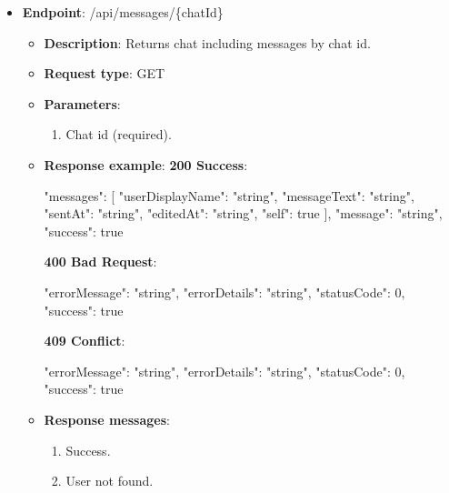 \begin{itemize}
    \item \textbf{Endpoint}: /api/messages/\{chatId\}
    \begin{itemize}
        \item \textbf{Description}: Returns chat including messages by chat id.
        \item \textbf{Request type}: GET
        \item \textbf{Parameters}:
        \begin{enumerate}
            \item Chat id (required).
        \end{enumerate}
        \item \textbf{Response example}:
        \textbf{200 Success}:
        \begin{spverbatim}
        {
            "messages": [
                {
                "userDisplayName": "string",
                "messageText": "string",
                "sentAt": "string",
                "editedAt": "string",
                "self": true
            }
            ],
            "message": "string",
            "success": true
        }
        \end{spverbatim}
        \textbf{400 Bad Request}:
        \begin{spverbatim}
        {
            "errorMessage": "string",
            "errorDetails": "string",
            "statusCode": 0,
            "success": true
        }
        \end{spverbatim}
        \textbf{409 Conflict}:
        \begin{spverbatim}
        {
            "errorMessage": "string",
            "errorDetails": "string",
            "statusCode": 0,
            "success": true
        }
        \end{spverbatim}
        \item \textbf{Response messages}:
        \begin{enumerate}
            \item Success.
            \item User not found.
        \end{enumerate}
    \end{itemize}


\end{itemize}
